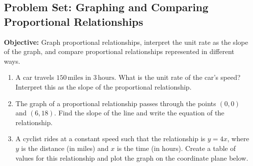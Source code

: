 \documentclass[12pt]{article}
\title{}
\date{}
\begin{document}
\subsection*{Problem Set: Graphing and Comparing Proportional Relationships}
\onehalfspacing

\begin{tcolorbox}[colframe=black!40, colback=gray!5, 
coltitle=black, colbacktitle=black!20, fonttitle=\bfseries\Large, 
title=Learning Objective, halign title=center, left=5pt, right=5pt, top=5pt, bottom=15pt]
\textbf{Objective:} Graph proportional relationships, interpret the unit rate as the slope of the graph, and compare proportional relationships represented in different ways.
\end{tcolorbox}

\begin{tcolorbox}[colframe=black!60, colback=white, 
coltitle=black, colbacktitle=black!15, fonttitle=\bfseries\Large, 
title=Exercises: Unit Rate and Slope, halign title=center, left=10pt, right=10pt, top=10pt, bottom=60pt]
\begin{enumerate}[itemsep=3em]
    \item A car travels \(150 \, \text{miles}\) in \(3 \, \text{hours}\). What is the unit rate of the car's speed? Interpret this as the slope of the proportional relationship.

    \item The graph of a proportional relationship passes through the points \((0, 0)\) and \((6, 18)\). Find the slope of the line and write the equation of the relationship.

    \item A cyclist rides at a constant speed such that the relationship is \(y = 4x\), where \(y\) is the distance (in miles) and \(x\) is the time (in hours). Create a table of values for this relationship and plot the graph on the coordinate plane below.
    
    \begin{center}
    \end{center}
\end{enumerate}
\end{tcolorbox}
\end{document}
